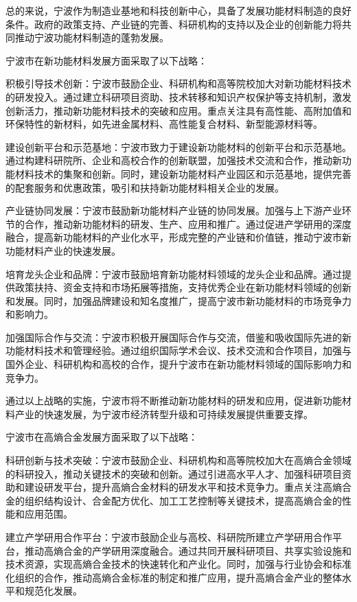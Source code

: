 总的来说，宁波作为制造业基地和科技创新中心，具备了发展功能材料制造的良好条件。政府的政策支持、产业链的完善、科研机构的支持以及企业的创新能力将共同推动宁波功能材料制造的蓬勃发展。

宁波市在新功能材料发展方面采取了以下战略：

积极引导技术创新：宁波市鼓励企业、科研机构和高等院校加大对新功能材料技术的研发投入。通过建立科研项目资助、技术转移和知识产权保护等支持机制，激发创新活力，推动新功能材料技术的突破和应用。重点关注具有高性能、高附加值和环保特性的新材料，如先进金属材料、高性能复合材料、新型能源材料等。

建设创新平台和示范基地：宁波市致力于建设新功能材料的创新平台和示范基地。通过构建科研院所、企业和高校合作的创新联盟，加强技术交流和合作，推动新功能材料技术的集聚和创新。同时，建设新功能材料产业园区和示范基地，提供完善的配套服务和优惠政策，吸引和扶持新功能材料相关企业的发展。

产业链协同发展：宁波市鼓励新功能材料产业链的协同发展。加强与上下游产业环节的合作，推动新功能材料的研发、生产、应用和推广。通过促进产学研用的深度融合，提高新功能材料的产业化水平，形成完整的产业链和价值链，推动宁波市新功能材料产业的快速发展。

培育龙头企业和品牌：宁波市鼓励培育新功能材料领域的龙头企业和品牌。通过提供政策扶持、资金支持和市场拓展等措施，支持优秀企业在新功能材料领域的创新和发展。同时，加强品牌建设和知名度推广，提高宁波市新功能材料的市场竞争力和影响力。

加强国际合作与交流：宁波市积极开展国际合作与交流，借鉴和吸收国际先进的新功能材料技术和管理经验。通过组织国际学术会议、技术交流和合作项目，加强与国外企业、科研机构和高校的合作，提升宁波市在新功能材料领域的国际影响力和竞争力。

通过以上战略的实施，宁波市将不断推动新功能材料的研发和应用，促进新功能材料产业的快速发展，为宁波市经济转型升级和可持续发展提供重要支撑。


宁波市在高熵合金发展方面采取了以下战略：

科研创新与技术突破：宁波市鼓励企业、科研机构和高等院校加大在高熵合金领域的科研投入，推动关键技术的突破和创新。通过引进高水平人才、加强科研项目资助和建设研发平台，提升高熵合金材料的研发水平和技术竞争力。重点关注高熵合金的组织结构设计、合金配方优化、加工工艺控制等关键技术，提高高熵合金的性能和应用范围。

建立产学研用合作平台：宁波市鼓励企业与高校、科研院所建立产学研用合作平台，推动高熵合金的产学研用深度融合。通过共同开展科研项目、共享实验设施和技术资源，实现高熵合金技术的快速转化和产业化。同时，加强与行业协会和标准化组织的合作，推动高熵合金标准的制定和推广应用，提升高熵合金产业的整体水平和规范化发展。

